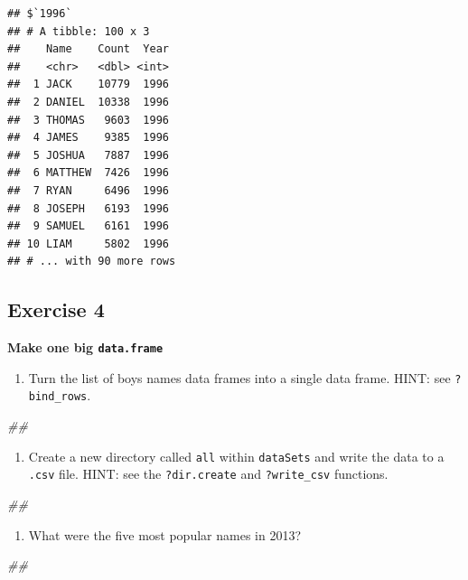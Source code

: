 \documentclass[
]{book}
\newenvironment{Shaded}{\begin{snugshade}}{\end{snugshade}}
\newcommand{\CommentTok}[1]{\textcolor[rgb]{0.56,0.35,0.01}{\textit{#1}}}
\providecommand{\tightlist}{%
  \setlength{\itemsep}{0pt}\setlength{\parskip}{0pt}}
\begin{document}
\begin{verbatim}
## $`1996`
## # A tibble: 100 x 3
##    Name    Count  Year
##    <chr>   <dbl> <int>
##  1 JACK    10779  1996
##  2 DANIEL  10338  1996
##  3 THOMAS   9603  1996
##  4 JAMES    9385  1996
##  5 JOSHUA   7887  1996
##  6 MATTHEW  7426  1996
##  7 RYAN     6496  1996
##  8 JOSEPH   6193  1996
##  9 SAMUEL   6161  1996
## 10 LIAM     5802  1996
## # ... with 90 more rows
\end{verbatim}

\hypertarget{exercise-4-1}{%
\subsection{Exercise 4}\label{exercise-4-1}}

\textbf{Make one big \texttt{data.frame}}

\begin{enumerate}
\def\labelenumi{\arabic{enumi}.}
\tightlist
\item
  Turn the list of boys names data frames into a single data frame. HINT: see \texttt{?bind\_rows}.
\end{enumerate}

\begin{Shaded}
\begin{Highlighting}[]
\CommentTok{\#\# }
\end{Highlighting}
\end{Shaded}

\begin{enumerate}
\def\labelenumi{\arabic{enumi}.}
\setcounter{enumi}{1}
\tightlist
\item
  Create a new directory called \texttt{all} within \texttt{dataSets} and write the data to a \texttt{.csv} file.
  HINT: see the \texttt{?dir.create} and \texttt{?write\_csv} functions.
\end{enumerate}

\begin{Shaded}
\begin{Highlighting}[]
\CommentTok{\#\# }
\end{Highlighting}
\end{Shaded}

\begin{enumerate}
\def\labelenumi{\arabic{enumi}.}
\setcounter{enumi}{2}
\tightlist
\item
  What were the five most popular names in 2013?
\end{enumerate}

\begin{Shaded}
\begin{Highlighting}[]
\CommentTok{\#\# }
\end{Highlighting}
\end{Shaded}
\end{document}
